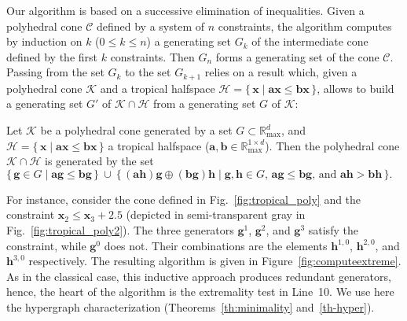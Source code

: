 \documentclass[proceedings]{stacs}
\newcommand{\mpplus}{\oplus}
\newcommand{\maxplus}{\mathbb{R}_{\max}}
\newcommand{\vect}[1]{\boldsymbol #1}
\newcommand{\CC}{\mathcal{C}}
\newcommand{\KK}{\mathcal{K}}
\newcommand{\HH}{\mathcal{H}}
\begin{document}
Our algorithm is based on a successive elimination of inequalities. Given a polyhedral cone $\CC$ defined by a system of $n$ constraints, the algorithm computes by induction on $k$ ($0 \leq k \leq n$) a generating set $G_k$ of the intermediate cone defined by the first $k$ constraints. Then $G_n$ forms a generating set of the cone $\CC$. 
Passing from the set $G_k$ to the set $G_{k+1}$ relies on a result which, given a polyhedral cone $\KK$ and a tropical halfspace $\HH = \{\, \vect{x} \mid \vect{a} \vect{x} \leq \vect{b} \vect{x} \,\}$, allows to build a generating set $G'$ of $\KK \cap \HH$ from a generating set $G$ of $\KK$:
\begin{theorem}\label{th:ddm}
Let $\KK$ be a polyhedral cone generated by a set $G \subset \maxplus^d$, and $\HH = \{\, \vect{x} \mid \vect{a} \vect{x} \leq \vect{b} \vect{x} \,\}$ a tropical halfspace ($\vect{a}, \vect{b} \in \maxplus^{1 \times d}$). Then the polyhedral cone $\KK \cap \HH$ is generated by the set
\(
\{\,\vect{g} \in G \mid \vect{a} \vect{g} \leq \vect{b} \vect{g}\,\} \ \cup \  \{\, (\vect{a} \vect{h}) \vect{g} \mpplus (\vect{b} \vect{g}) \vect{h} \mid \vect{g},\vect{h} \in G \text{, } \vect{a} \vect{g} \leq \vect{b} \vect{g} \text{, and }
\vect{a} \vect{h} > \vect{b} \vect{h} \,\} .
\)
\end{theorem}
For instance, consider the cone defined in Fig.~\ref{fig:tropical_poly} and the constraint $\vect{x}_2 \leq \vect{x}_3 + 2.5$ (depicted in semi-transparent gray in Fig.~\ref{fig:tropical_poly2}). The three generators $\vect{g}^1$, $\vect{g}^2$, and $\vect{g}^3$ satisfy the constraint, while $\vect{g}^0$ does not. Their combinations are the elements $\vect{h}^{1,0}$, $\vect{h}^{2,0}$, and $\vect{h}^{3,0}$ respectively. 
The resulting algorithm is given in Figure~\ref{fig:computeextreme}. As in the classical case, this inductive approach produces redundant generators, hence, the heart of the algorithm is the extremality test in Line~10. We use
here the hypergraph characterization (Theorems~\ref{th:minimality} and~\ref{th-hyper}).
\end{document}
